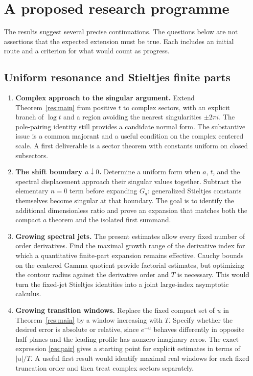 \section{A proposed research programme}
\label{sec:questions}

The results suggest several precise continuations. The questions below are
not assertions that the expected extension must be true. Each includes an
initial route and a criterion for what would count as progress.

\subsection{Uniform resonance and Stieltjes finite parts}
\begin{enumerate}[label=R\arabic*.,leftmargin=*]
\item \textbf{Complex approach to the singular argument.}
Extend Theorem~\ref{res:main} from positive $t$ to complex sectors, with
an explicit branch of $\log t$ and a region avoiding the nearest singularities
$\pm2\pi i$. The pole-pairing identity still provides a candidate normal
form. The substantive issue is a common majorant and a useful condition
on the complex centered scale. A first deliverable is a sector theorem
with constants uniform on closed subsectors.

\item \textbf{The shift boundary $a\downarrow0$.}
Determine a uniform form when $a$, $t$, and the spectral displacement
approach their singular values together. Subtract the elementary $n=0$
term before expanding $G_a$: generalized Stieltjes constants themselves
become singular at that boundary. The goal is to identify the additional
dimensionless ratio and prove an expansion that matches both the compact
$a$ theorem and the isolated first summand.

\item \textbf{Growing spectral jets.}
The present estimates allow every fixed number of order derivatives.
Find the maximal growth range of the derivative index for which a
quantitative finite-part expansion remains effective. Cauchy bounds on
the centered Gamma quotient provide factorial estimates, but optimizing
the contour radius against the derivative order and $T$ is necessary.
This would turn the fixed-jet Stieltjes identities into a joint
large-index asymptotic calculus.

\item \textbf{Growing transition windows.}
Replace the fixed compact set of $u$ in Theorem~\ref{res:main} by a
window increasing with $T$. Specify whether the desired error is absolute
or relative, since $e^{-u}$ behaves differently in opposite half-planes
and the leading profile has nonzero imaginary zeros. The exact expression
\eqref{res:pair} gives a starting point for explicit estimates in terms of
$|u|/T$. A useful first result would identify maximal real windows for
each fixed truncation order and then treat complex sectors separately.
\end{enumerate}


